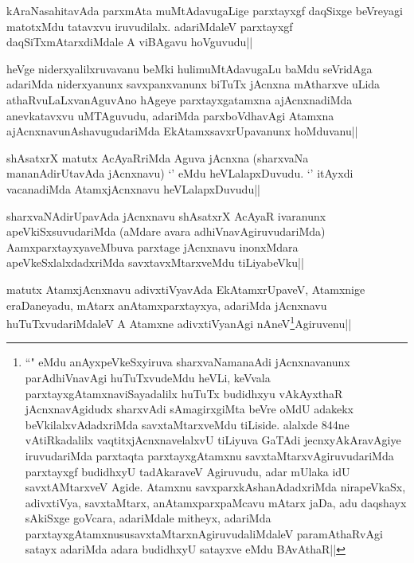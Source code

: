 \begin{artha}
kAraNasahitavAda parxmAta  muMtAdavugaLige parxtayxgf daqSixge beVreyagi matotxMdu tatavxvu iruvudilalx. adariMdaleV parxtayxgf daqSiTxmAtarxdiMdale A viBAgavu hoVguvudu||
\end{artha}


\begin{artha}
heVge niderxyalilxruvavanu beMki hulimuMtAdavugaLu baMdu seVridAga adariMda niderxyanunx savxpanxvanunx biTuTx jAcnxna mAtharxve uLida athaRvuLaLxvanAguvAno hAgeye parxtayxgatamxna ajAcnxnadiMda anevkatavxvu uMTAguvudu, adariMda parxboVdhavAgi Atamxna ajAcnxnavunAshavugudariMda EkAtamxsavxrUpavanunx hoMduvanu||
\end{artha}


\begin{artha}
shAsatxrX matutx AcAyaRriMda Aguva jAcnxna (sharxvaNa mananAdirUtavAda jAcnxnavu) `\stext' eMdu heVLalapxDuvudu. `\stext' itAyxdi vacanadiMda AtamxjAcnxnavu heVLalapxDuvudu||
\end{artha}



\begin{artha}
sharxvaNAdirUpavAda jAcnxnavu shAsatxrX AcAyaR ivaranunx apeVkiSxsuvudariMda (aMdare avara adhiVnavAgiruvudariMda) AamxparxtayxyaveMbuva parxtage jAcnxnavu inonxMdara apeVkeSxlalxdadxriMda savxtavxMtarxveMdu tiLiyabeVku||
\end{artha}

\begin{artha}
matutx AtamxjAcnxnavu adivxtiVyavAda EkAtamxrUpaveV, Atamxnige eraDaneyadu, mAtarx anAtamxparxtayxya, adariMda jAcnxnavu huTuTxvudariMdaleV A Atamxne adivxtiVyanAgi nAneV\footnote{``\stext" eMdu anAyxpeVkeSxyiruva sharxvaNamanaAdi jAcnxnavanunx parAdhiVnavAgi huTuTxvudeMdu heVLi, keVvala parxtayxgAtamxnaviSayadalilx huTuTx  budidhxyu vAkAyxthaR jAcnxnavAgidudx sharxvAdi sAmagirxgiMta beVre oMdU adakekx beVkilalxvAdadxriMda savxtaMtarxveMdu tiLiside. alalxde 844ne vAtiRkadalilx vaqtitxjAcnxnavelalxvU tiLiyuva GaTAdi jecnxyAkAravAgiye iruvudariMda parxtaqta parxtayxgAtamxnu savxtaMtarxvAgiruvudariMda parxtayxgf budidhxyU tadAkaraveV Agiruvudu, adar mUlaka idU savxtAMtarxveV Agide. Atamxnu savxparxkAshanAdadxriMda nirapeVkaSx, adivxtiVya, savxtaMtarx, anAtamxparxpaMcavu mAtarx jaDa, adu daqshayx sAkiSxge goVcara, adariMdale mitheyx, adariMda parxtayxgAtamxnususavxtaMtarxnAgiruvudaliMdaleV paramAthaRvAgi satayx adariMda adara budidhxyU satayxve eMdu BAvAthaR||}Agiruvenu||
\end{artha}


